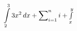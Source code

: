 \documentclass[preview,border=6pt]{standalone}
\begin{document}
\fontsize{30.000000}{36.000000}\selectfont
$\displaystyle \displaystyle\int\limits_2^3 3x^2\,dx + \sum\nolimits^n_{i=1}i + \textstyle\int\limits_x^y$
\end{document}
